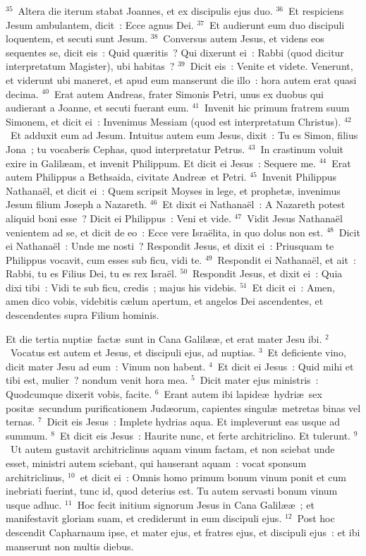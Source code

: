 ${}^{35}$~Altera die iterum stabat Joannes, et ex discipulis ejus duo.
${}^{36}$~Et respiciens Jesum ambulantem, dicit~: Ecce agnus Dei.
${}^{37}$~Et audierunt eum duo discipuli loquentem, et secuti sunt Jesum.
${}^{38}$~Conversus autem Jesus, et videns eos sequentes se, dicit eis~: Quid qu\ae ritis~? Qui dixerunt ei~: Rabbi (quod dicitur interpretatum Magister), ubi habitas~?
${}^{39}$~Dicit eis~: Venite et videte. Venerunt, et viderunt ubi maneret, et apud eum manserunt die illo~: hora autem erat quasi decima.
${}^{40}$~Erat autem Andreas, frater Simonis Petri, unus ex duobus qui audierant a Joanne, et secuti fuerant eum.
${}^{41}$~Invenit hic primum fratrem suum Simonem, et dicit ei~: Invenimus Messiam (quod est interpretatum Christus).
${}^{42}$~Et adduxit eum ad Jesum. Intuitus autem eum Jesus, dixit~: Tu es Simon, filius Jona~; tu vocaberis Cephas, quod interpretatur Petrus.
${}^{43}$~In crastinum voluit exire in Galil\ae am, et invenit Philippum. Et dicit ei Jesus~: Sequere me.
${}^{44}$~Erat autem Philippus a Bethsaida, civitate Andre\ae\ et Petri.
${}^{45}$~Invenit Philippus Nathana\"el, et dicit ei~: Quem scripsit Moyses in lege, et prophet\ae , invenimus Jesum filium Joseph a Nazareth.
${}^{46}$~Et dixit ei Nathana\"el~: A Nazareth potest aliquid boni esse~? Dicit ei Philippus~: Veni et vide.
${}^{47}$~Vidit Jesus Nathana\"el venientem ad se, et dicit de eo~: Ecce vere Isra\"elita, in quo dolus non est.
${}^{48}$~Dicit ei Nathana\"el~: Unde me nosti~? Respondit Jesus, et dixit ei~: Priusquam te Philippus vocavit, cum esses sub ficu, vidi te.
${}^{49}$~Respondit ei Nathana\"el, et ait~: Rabbi, tu es Filius Dei, tu es rex Isra\"el.
${}^{50}$~Respondit Jesus, et dixit ei~: Quia dixi tibi~: Vidi te sub ficu, credis~; majus his videbis.
${}^{51}$~Et dicit ei~: Amen, amen dico vobis, videbitis c\ae lum apertum, et angelos Dei ascendentes, et descendentes supra Filium hominis.

\lettrine[lines=3,image=true,loversize=0.05,lraise=-0.03]{E}{}t die tertia nupti\ae\ fact\ae\ sunt in Cana Galil\ae \ae , et erat mater Jesu ibi.
${}^{2}$~Vocatus est autem et Jesus, et discipuli ejus, ad nuptias.
${}^{3}$~Et deficiente vino, dicit mater Jesu ad eum~: Vinum non habent.
${}^{4}$~Et dicit ei Jesus~: Quid mihi et tibi est, mulier~? nondum venit hora mea.
${}^{5}$~Dicit mater ejus ministris~: Quodcumque dixerit vobis, facite.
${}^{6}$~Erant autem ibi lapide\ae\ hydri\ae\ sex posit\ae\ secundum purificationem Jud\ae orum, capientes singul\ae\ metretas binas vel ternas.
${}^{7}$~Dicit eis Jesus~: Implete hydrias aqua. Et impleverunt eas usque ad summum.
${}^{8}$~Et dicit eis Jesus~: Haurite nunc, et ferte architriclino. Et tulerunt.
${}^{9}$~Ut autem gustavit architriclinus aquam vinum factam, et non sciebat unde esset, ministri autem sciebant, qui hauserant aquam~: vocat sponsum architriclinus,
${}^{10}$~et dicit ei~: Omnis homo primum bonum vinum ponit et cum inebriati fuerint, tunc id, quod deterius est. Tu autem servasti bonum vinum usque adhuc.
${}^{11}$~Hoc fecit initium signorum Jesus in Cana Galil\ae \ae~; et manifestavit gloriam suam, et crediderunt in eum discipuli ejus.
${}^{12}$~Post hoc descendit Capharnaum ipse, et mater ejus, et fratres ejus, et discipuli ejus~: et ibi manserunt non multis diebus.


